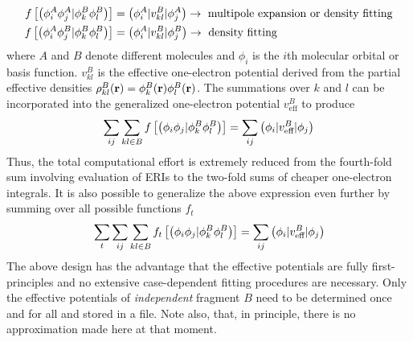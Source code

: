 \subsection{\label{ss:2.3}}

%
\begin{subequations}
 \begin{align}
 f\left[ 
   \ERIc{\phi_i^A}{\phi_j^A}{\phi_k^B}{\phi_l^B}
 \right] &= \OEIc{\phi_i^A}{v_{kl}^B}{\phi_j^A} \rightarrow \text{ multipole expansion or density fitting}\\
%
 f\left[ 
   \ERIc{\phi_i^A}{\phi_j^B}{\phi_k^B}{\phi_l^B}
 \right] &= \OEIc{\phi_i^A}{v_{kl}^B}{\phi_j^B} \rightarrow \text{ density fitting}
 \end{align}
\end{subequations}
%
where $A$ and $B$ denote different molecules and $\phi_i$ is the $i$th molecular orbital
or basis function.
$v_{kl}^B$ is the effective one-electron potential derived from the partial
effective densities $\rho_{kl}^B({\bf r}) = \phi_k^B({\bf r})\phi_l^B({\bf r})$.
The summations over $k$ and $l$ can be incorporated into the generalized one-electron potential
$v_{\text{eff}}^B$
to produce
%
\begin{equation}
 \sum_{ij}\sum_{kl\in B} f\left[ 
   \left(\phi_i \phi_j \vert \phi_k^B \phi_l^B \right)
 \right] = \sum_{ij} \left(\phi_i \lvert v_{\text{eff}}^B \rvert \phi_j \right) 
\end{equation}
%
Thus, the total computational effort is extremely reduced from the fourth-fold
sum involving evaluation of ERIs to the two-fold sums of cheaper one-electron integrals.
It is also possible to generalize the above expression even further by
summing over all possible functions $f_t$
%
\begin{equation} \label{e:ft-reduction}
 \sum_t \sum_{ij}\sum_{kl\in B} f_t\left[ 
   \left(\phi_i \phi_j \vert \phi_k^B \phi_l^B \right)
 \right] = \sum_{ij} \left(\phi_i \lvert v_{\text{eff}}^B \rvert \phi_j \right) 
\end{equation}
%
The above design has the advantage that the effective potentials are fully first-principles
and no extensive case-dependent fitting procedures are necessary.
Only the effective potentials of \emph{independent} fragment $B$ need to be determined once and for all
and stored in a file. Note also, that, in principle, there is no approximation 
made here at that moment.

